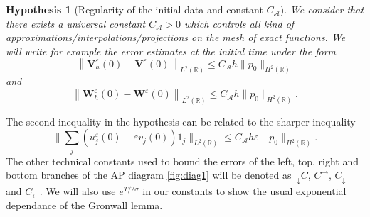 \documentclass[a4paper,french,english,10pt]{article}
\newcommand\eps{\varepsilon}
\newtheorem{hyp}[theorem]{Hypothesis}
\begin{document}
\begin{hyp}[Regularity of the initial data   and constant $C_\mathcal A$] \label{initdata1d}
 We consider that there exists 
a  universal constant $C_{\mathcal A}>0$
which controls all kind of  approximations/interpolations/projections   on the mesh  of 
exact functions. 
We will write for example
the error  estimates at the initial time under the form 
\begin{equation} \label{hyphen:1}
\left\| \mathbf V_h^\varepsilon(0) -  \mathbf V^\varepsilon(0) \right\|_{L^2(\mathbb R)} \leq C_\mathcal A h 
 \|p_0\|_{H^2(\mathbb{R})}
\end{equation}
and 
\begin{equation} \label{hyphen:2}
\left\| \mathbf W_h^\varepsilon(0) -  \mathbf W^\varepsilon(0) \right\|_{L^2(\mathbb R)} \leq C_\mathcal A h 
 \|p_0\|_{H^2(\mathbb{R})}.
\end{equation}
\end{hyp}
The second inequality in the hypothesis  can be  related to %
the sharper inequality %
\begin{equation}\label{init_1D}
\bigg\| \sum_j \left(  u_j^{\eps}(0) - \eps  v_j(0)  \right) 1_j  \bigg\|_{L^2(\mathbb{R})} \leq C_\mathcal A h\eps \|p_0\|_{H^2(\mathbb{R})}.
\end{equation}
The other technical  constants used to bound the errors of the left,  top, right and bottom   branches of the AP diagram \ref{fig:diag1}
will be denoted as  $~_\downarrow C$, $C^\rightarrow $, $C_\downarrow $ and  $C_\leftarrow$.   
We will also use  $e^{T/2\sigma}$ in our constants to show the usual exponential dependance of the Gronwall lemma. 
\end{document}
